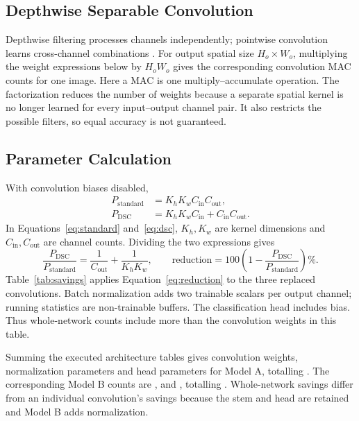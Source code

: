 \subsection{Depthwise Separable Convolution}
Depthwise filtering processes channels independently; pointwise convolution
learns cross-channel combinations \cite{howard2017}. For output spatial size
$H_o\times W_o$, multiplying the weight expressions below by $H_oW_o$ gives
the corresponding convolution MAC counts for one image.
Here a MAC is one multiply--accumulate operation. The factorization reduces
the number of weights because a separate spatial kernel is no longer learned
for every input--output channel pair. It also restricts the possible filters,
so equal accuracy is not guaranteed.
\subsection{Parameter Calculation}
With convolution biases disabled,
\begin{align}
P_{\mathrm{standard}} &= K_hK_wC_{\mathrm{in}}C_{\mathrm{out}},\label{eq:standard}\\
P_{\mathrm{DSC}} &= K_hK_wC_{\mathrm{in}} + C_{\mathrm{in}}C_{\mathrm{out}}.\label{eq:dsc}
\end{align}
In Equations~\eqref{eq:standard} and~\eqref{eq:dsc}, $K_h,K_w$ are kernel
dimensions and $C_{\mathrm{in}},C_{\mathrm{out}}$ are channel counts. Dividing
the two expressions gives
\begin{equation}
\frac{P_{\mathrm{DSC}}}{P_{\mathrm{standard}}}
=\frac{1}{C_{\mathrm{out}}}+\frac{1}{K_hK_w},
\qquad
\text{reduction}=100\left(1-\frac{P_{\mathrm{DSC}}}{P_{\mathrm{standard}}}\right)\%.
\label{eq:reduction}
\end{equation}
Table~\ref{tab:savings} applies Equation~\eqref{eq:reduction} to the three
replaced convolutions. Batch normalization adds two
trainable scalars per output channel; running statistics are non-trainable
buffers. The classification head includes bias. Thus whole-network counts
include more than the convolution weights in this table.

Summing the executed architecture tables gives \AConvParams{} convolution
weights, \ABnParams{} normalization parameters and \AHeadParams{} head
parameters for Model A, totalling \AParams{}. The corresponding Model B
counts are \BConvParams{}, \BBnParams{} and \BHeadParams{}, totalling
\BParams{}. Whole-network savings differ from an individual convolution's
savings because the stem and head are retained and Model B adds normalization.

